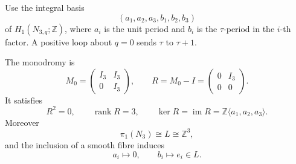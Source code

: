 Use the integral basis
\[
 (a_1,a_2,a_3,b_1,b_2,b_3)
\]
of \(H_1(N_{3,q};\mathbb Z)\), where \(a_i\) is the unit period and \(b_i\)
is the \(\tau\)-period in the \(i\)-th factor.  A positive loop about
\(q=0\) sends \(\tau\) to \(\tau+1\).

\begin{proposition}
\label{hrftd:prop:cusp-monodromy}
The monodromy is
\begin{equation}
 M_0=
 \begin{pmatrix}I_3&I_3\\0&I_3\end{pmatrix},
 \qquad
 R=M_0-I=
 \begin{pmatrix}0&I_3\\0&0\end{pmatrix}.
 \label{hrftd:eq:cusp-monodromy}
\end{equation}
It satisfies
\[
 R^2=0,\qquad
 \operatorname{rank}R=3,\qquad
 \ker R=\operatorname{im}R
 =\mathbb Z\langle a_1,a_2,a_3\rangle.
\]
Moreover
\[
 \pi_1(N_3)\cong L\cong\mathbb Z^3,
\]
and the inclusion of a smooth fibre induces
\begin{equation}
 a_i\longmapsto0,\qquad b_i\longmapsto e_i\in L.
 \label{hrftd:eq:cusp-pi-one-map}
\end{equation}
\end{proposition}

